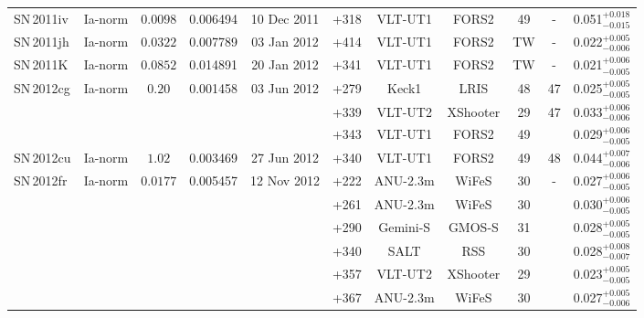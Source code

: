 \documentclass[fleqn,usenatbib]{mnras}
\begin{document}
\begin{table}
{\begin{tabular}{l c c c c c c c c c c}
    SN\,2011iv & Ia-norm   & $0.0098$  & 0.006494 & 10 Dec 2011  & +318   & VLT-UT1  & FORS2         & 49& -  & 0.051$^{+0.018}_{-0.015}$ \\
    SN\,2011jh & Ia-norm   & $0.0322$  & 0.007789 & 03 Jan 2012  & +414   & VLT-UT1  & FORS2         & TW& -  & 0.022$^{+0.005}_{-0.006}$ \\
    SN\,2011K  & Ia-norm   & $0.0852$  & 0.014891 & 20 Jan 2012  & +341   & VLT-UT1  & FORS2         & TW& -  & 0.021$^{+0.006}_{-0.005}$ \\
    SN\,2012cg & Ia-norm   & $0.20$    & 0.001458 & 03 Jun 2012  & +279   & Keck1    & LRIS          & 48 & 47& 0.025$^{+0.005}_{-0.005}$ \\
             &           &           &          &              & +339   & VLT-UT2  & XShooter     & 29& 47 & 0.033$^{+0.006}_{-0.006}$ \\
             &           &           &          &              & +343   & VLT-UT1  & FORS2         & 49&    & 0.029$^{+0.006}_{-0.005}$ \\
    SN\,2012cu & Ia-norm   & $1.02$    & 0.003469 & 27 Jun 2012  & +340   & VLT-UT1  & FORS2         & 49& 48 & 0.044$^{+0.007}_{-0.006}$ \\
    SN\,2012fr & Ia-norm   & $0.0177$ & 0.005457 & 12 Nov 2012  & +222   & ANU-2.3m & WiFeS         & 30&  - & 0.027$^{+0.006}_{-0.005}$ \\
             &           &          &          &              & +261   & ANU-2.3m & WiFeS         & 30&    & 0.030$^{+0.006}_{-0.005}$ \\
             &           &          &          &              & +290   & Gemini-S & GMOS-S        & 31&    & 0.028$^{+0.005}_{-0.005}$ \\
             &           &          &          &              & +340   & SALT     & RSS           & 30&    & 0.028$^{+0.008}_{-0.007}$ \\
             &           &          &          &              & +357   & VLT-UT2  & XShooter     & 29&    & 0.023$^{+0.005}_{-0.005}$ \\
             &           &          &          &              & +367   & ANU-2.3m & WiFeS         & 30&    & 0.027$^{+0.005}_{-0.006}$ \\

\end{tabular}}
\end{table}
\end{document}
